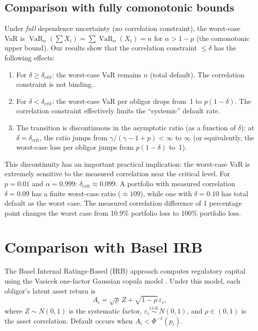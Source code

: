 \documentclass[11pt]{article}
\theoremstyle{definition}
\newcommand{\VaR}{\operatorname{VaR}}
\newcommand{\1}{\mathbf{1}}
\begin{document}
\subsection{Comparison with fully comonotonic bounds}

Under \emph{full} dependence uncertainty (no correlation constraint), the worst-case VaR is $\VaR_\alpha(\sum X_i) = \sum \VaR_\alpha(X_i) = n$ for $\alpha > 1-p$ (the comonotonic upper bound). Our results show that the correlation constraint $\leq \delta$ has the following effects:
\begin{enumerate}
  \item For $\delta \geq \delta_{\mathrm{crit}}$: the worst-case VaR remains $n$ (total default). The correlation constraint is not binding.
  \item For $\delta < \delta_{\mathrm{crit}}$: the worst-case VaR per obligor drops from~1 to $p(1-\delta)$. The correlation constraint effectively limits the ``systemic'' default rate.
  \item The transition is discontinuous in the asymptotic ratio (as a function of $\delta$): at $\delta = \delta_{\mathrm{crit}}$, the ratio jumps from $\gamma/(\gamma - 1 + p) < \infty$ to $\infty$ (or equivalently, the worst-case loss per obligor jumps from $p(1-\delta)$ to~1).
\end{enumerate}

This discontinuity has an important practical implication: the worst-case VaR is extremely sensitive to the measured correlation near the critical level. For $p = 0.01$ and $\alpha = 0.999$: $\delta_{\mathrm{crit}} \approx 0.099$. A portfolio with measured correlation $\delta = 0.09$ has a finite worst-case ratio ($\approx 109$), while one with $\delta = 0.10$ has total default as the worst case. The measured correlation difference of 1 percentage point changes the worst case from 10.9\% portfolio loss to 100\% portfolio loss.

\section{Comparison with Basel IRB}\label{sec:basel}

The Basel Internal Ratings-Based (IRB) approach computes regulatory capital using the Vasicek one-factor Gaussian copula model \citep{Vasicek2002, BCBS2006}. Under this model, each obligor's latent asset return is
\[
  A_i = \sqrt{\rho}\,Z + \sqrt{1-\rho}\,\varepsilon_i,
\]
where $Z \sim N(0,1)$ is the systematic factor, $\varepsilon_i \stackrel{\text{i.i.d.}}{\sim} N(0,1)$, and $\rho \in (0,1)$ is the asset correlation. Default occurs when $A_i < \Phi^{-1}(p_i)$.
\end{document}

